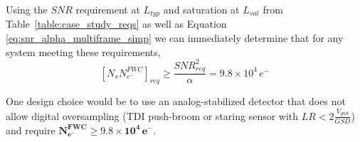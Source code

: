 \documentclass[10pt,journal]{IEEEtran}  %
\begin{document}
\begin{table}[t]
\centering
{}
\caption{Case study requirements and assumptions.}
\label{table:case_study_reqs}
\end{table}

Using the $SNR$ requirement at $L_{typ}$ and saturation at $L_{sat}$ from Table~\ref{table:case_study_reqs} as well as Equation \eqref{eq:snr_alpha_multiframe_simp} we can immediately determine that for any system meeting these requirements,
\begin{equation}
    \left[N_sN_{e^-}^{FWC}\right]_{req} \geq \frac{SNR_{req}^2}{\alpha} = 9.8\times 10^4 \, e^-
    \label{eq:NsNeFWC_req}
\end{equation}

One design choice would be to use an analog-stabilized detector that does not allow digital oversampling (TDI push-broom or staring sensor with $LR < 2\frac{V_{gnd}}{GSD}$) and require $\mathbf{N_{e^-}^{FWC} \geq 9.8\times 10^4 \, e^-}$.  
\end{document}
